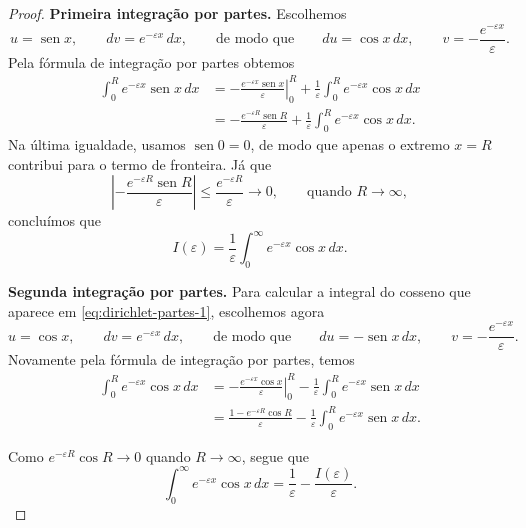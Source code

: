 \documentclass[12pt,portuguese]{article}
\theoremstyle{definition}
\theoremstyle{plainexercise}
\theoremstyle{starredexercise}
\theoremstyle{definition}
\renewcommand{\sin}{\operatorname{sen}}
\begin{document}
\begin{proof}
\smallskip
\noindent\textbf{Primeira integração por partes.}
Escolhemos
\[
u=\sin x,
\qquad
dv=e^{-\varepsilon x}\,dx,
\qquad\text{de modo que}\qquad
du=\cos x\,dx,
\qquad
v=-\frac{e^{-\varepsilon x}}{\varepsilon}.
\]
Pela fórmula de integração por partes obtemos
\begin{align*}
\int_0^R e^{-\varepsilon x}\sin x\,dx
&=
\left.-\frac{e^{-\varepsilon x}\sin x}{\varepsilon}\right|_0^R
+\frac{1}{\varepsilon}\int_0^R e^{-\varepsilon x}\cos x\,dx
\\[0.2cm]
&=
-\frac{e^{-\varepsilon R}\sin R}{\varepsilon}
+\frac{1}{\varepsilon}\int_0^R e^{-\varepsilon x}\cos x\,dx .
\end{align*}
Na última igualdade, usamos $\sin0=0$, de modo que apenas o extremo $x=R$
contribui para o termo de fronteira. Já que
\[
\left|-\frac{e^{-\varepsilon R}\sin R}{\varepsilon}\right|
\leqslant\frac{e^{-\varepsilon R}}{\varepsilon}
\longrightarrow0, 
\qquad\text{quando }R\to\infty,
\]
concluímos que
\begin{equation}\label{eq:dirichlet-partes-1}
I(\varepsilon)
=
\frac{1}{\varepsilon}\int_0^\infty e^{-\varepsilon x}\cos x\,dx .
\end{equation}

\smallskip
\noindent\textbf{Segunda integração por partes.}
Para calcular a integral do cosseno que aparece em
\eqref{eq:dirichlet-partes-1}, escolhemos agora
\[
u=\cos x,
\qquad
dv=e^{-\varepsilon x}\,dx,
\qquad\text{de modo que}\qquad
du=-\sin x\,dx,
\qquad
v=-\frac{e^{-\varepsilon x}}{\varepsilon}.
\]
Novamente pela fórmula de integração por partes, temos
\begin{align*}
\int_0^R e^{-\varepsilon x}\cos x\,dx
&=
\left.-\frac{e^{-\varepsilon x}\cos x}{\varepsilon}\right|_0^R
-\frac{1}{\varepsilon}\int_0^R e^{-\varepsilon x}\sin x\,dx
\\[0.2cm]
&=
\frac{1-e^{-\varepsilon R}\cos R}{\varepsilon}
-\frac{1}{\varepsilon}\int_0^R e^{-\varepsilon x}\sin x\,dx .
\end{align*}

Como
$e^{-\varepsilon R}\cos R\to0$ quando $R\to\infty$, segue que
\begin{equation}\label{eq:dirichlet-partes-2}
\int_0^\infty e^{-\varepsilon x}\cos x\,dx
=
\frac{1}{\varepsilon}-\frac{I(\varepsilon)}{\varepsilon}.
\end{equation}


\end{proof}
\end{document}
